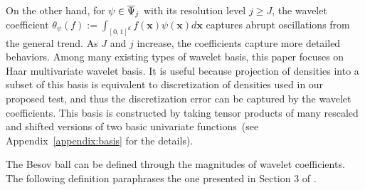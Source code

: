 \documentclass[twoside,11pt]{article}
\newcommand{\vectorize}[1]{\mathbf{#1}}
\newcommand{\wavMotherFunc}{\psi} %
\newcommand{\WavMotherBasisSet}{\overline{\uppercase{\Psi}}}
\newcommand{\resLev}{j}
\newcommand{\primResLev}{J}
\newcommand{\wavCoef}{\theta}
\newcommand{\wavGenericMotherCoef}{\wavCoef_{\wavMotherFunc}}
\begin{document}
On the other hand, for 
$\wavMotherFunc \in \WavMotherBasisSet_{\resLev}$ with its resolution level $\resLev \geq \primResLev$, the wavelet coefficient
$\wavGenericMotherCoef(f)
:=
\int_{[0,1]^d}
f(\vectorize{x})
\wavMotherFunc(\vectorize{x})d\vectorize{x}$
captures abrupt oscillations from the general trend.
As $\primResLev$ and $\resLev$ increase, the coefficients capture more detailed behaviors.
Among many existing types of wavelet basis, this paper focuses on Haar multivariate wavelet basis.
It is useful because projection of densities into a subset of this basis is equivalent to discretization of densities used in our proposed test, and thus the discretization error can be captured by the wavelet coefficients.
This basis is constructed by taking tensor products of many rescaled and shifted versions of two basic univariate functions~(see Appendix~\ref{appendix:basis} for the details).

The Besov ball can be defined through the magnitudes of wavelet coefficients. The following definition paraphrases the one presented in Section 3 of \citet{tang2023Besov}.
\end{document}
